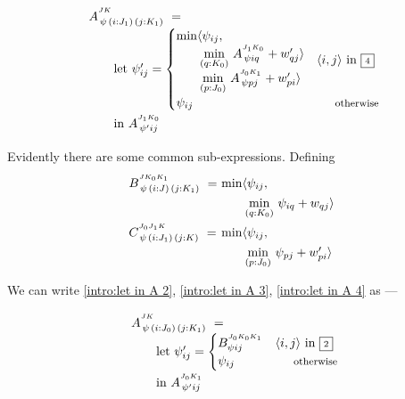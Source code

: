 \begin{equation}\LeftEqNo
\renewcommand\arraystretch{1.5}
\begin{array}{l@{}l}
	A^{^{JK}}_{\,\psi\,(i : J_1)\,(j : K_1)} ~=~ \\
	\qquad
	\textrm{let}~\psi'_{ij} = \begin{cases} 
	  \begin{array}{@{}l@{}l@{}}\min\langle & \psi_{ij}, \\
         & \!\underset{(q:K_0)}\min ~ A^{^{J_1K_0}}_{\,\psi iq} + w'_{qj}\rangle \\
         & \!\underset{(p:J_0)}\min ~ A^{^{J_0K_1}}_{\,\psi pj} + w'_{pi}\rangle \end{array} & \langle i,j\rangle\mbox{ in }\qbox4 \\
	  \psi_{ij} & \otherwise \\
	\end{cases} \\
	\qquad\textrm{in}~
	A^{^{J_1K_0}}_{\,\psi' ij}
\end{array}
\label{intro:let in A 4}
\end{equation}

Evidently there are some common sub-expressions. Defining
\begin{equation}
\renewcommand\arraystretch{1.3}
\begin{array}{l@{}l@{}l}
	B^{^{JK_0K_1}}_{\,\psi\,(i : J)\,(j : K_1)} ~=~ &
	  \min\langle & \psi_{ij}, \\ 
	&  & \!\underset{(q:K_0)}\min ~ \psi_{iq} + w_{qj}\rangle \\[.8em]
	C^{^{J_0J_1K}}_{\,\psi\,(i : J_1)\,(j : K)} ~=~ &
	  \min\langle & \psi_{ij}, \\ 
	&  & \!\underset{(p:J_0)}\min ~ \psi_{pj} + w'_{pi}\rangle 
\end{array}
\end{equation}

We can write \eqref{intro:let in A 2}, \eqref{intro:let in A 3}, \eqref{intro:let in A 4} as ---

\begin{equation}\LeftEqNo
\renewcommand\arraystretch{1.5}
\begin{array}{l@{}l}
	A^{^{JK}}_{\,\psi\,(i : J_0)\,(j : K_1)} ~=~ \\
	\qquad
	\textrm{let}~\psi'_{ij} = \begin{cases}
	  B^{^{J_0K_0K_1}}_{\psi ij} & \langle i,j\rangle\mbox{ in }\qbox2 \\
	  \psi_{ij} & \otherwise
	\end{cases} \\
	\qquad\textrm{in}~
	A^{^{J_0K_1}}_{\,\psi' ij}
\end{array}
\label{intro:let in A 2 using B}
\end{equation}

